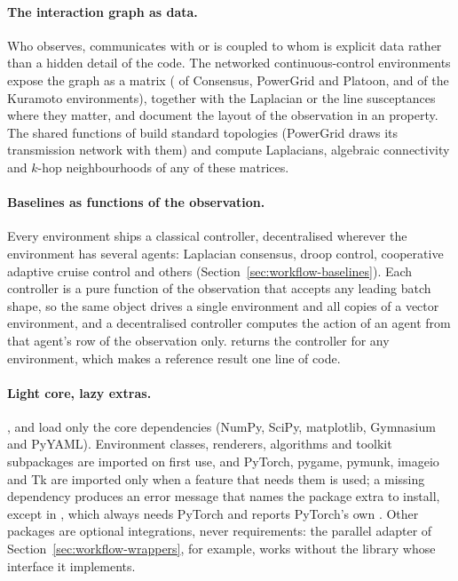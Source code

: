 \paragraph{The interaction graph as data.}
Who observes, communicates with or is coupled to whom is explicit data rather
than a hidden detail of the code. The networked continuous-control
environments expose the graph as a matrix ( of Consensus,
PowerGrid and Platoon,  and  of
the Kuramoto environments), together with the Laplacian or the line
susceptances where they matter, and document the layout of the observation in
an  property. The shared functions of
 build standard topologies (PowerGrid draws its
transmission network with them) and compute Laplacians, algebraic
connectivity and $k$-hop neighbourhoods of any of these matrices.

\paragraph{Baselines as functions of the observation.}
Every environment ships a classical controller, decentralised wherever the
environment has several agents: Laplacian consensus, droop control,
cooperative adaptive cruise control and others
(Section~\ref{sec:workflow-baselines}). Each controller is a pure function of
the observation that accepts any leading batch shape, so the same object
drives a single environment and all copies of a vector environment, and a
decentralised controller computes the action of an agent from that agent's
row of the observation only.
 returns the controller for any
environment, which makes a reference result one line of code.

\paragraph{Light core, lazy extras.}
,  and
 load only the core dependencies (NumPy, SciPy,
matplotlib, Gymnasium and PyYAML). Environment classes, renderers, algorithms
and toolkit subpackages are imported on first use, and PyTorch, pygame,
pymunk, imageio and Tk are imported only when a feature that needs them is
used; a missing dependency produces an error message that names the package
extra to install, except in , which always needs PyTorch
and reports PyTorch's own . Other packages are optional integrations, never
requirements: the parallel adapter of Section~\ref{sec:workflow-wrappers},
for example, works without the library whose interface it implements.

